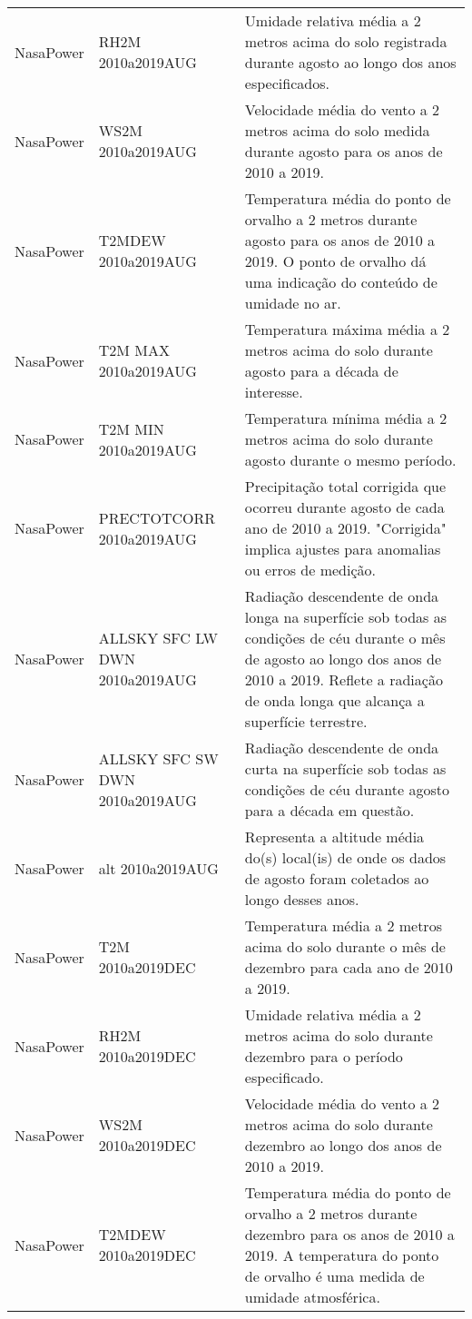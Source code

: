 \begin{longtable}{@{} p{4cm} p{4cm} p{8cm} @{}}
	NasaPower &
	RH2M 2010a2019AUG &
	Umidade relativa média a 2 metros acima do solo registrada durante agosto ao longo dos anos especificados. \\
	NasaPower &
	WS2M 2010a2019AUG &
	Velocidade média do vento a 2 metros acima do solo medida durante agosto para os anos de 2010 a 2019. \\
	NasaPower &
	T2MDEW 2010a2019AUG &
	Temperatura média do ponto de orvalho a 2 metros durante agosto para os anos de 2010 a 2019. O ponto de orvalho dá uma indicação do conteúdo de umidade no ar. \\
	NasaPower &
	T2M MAX 2010a2019AUG &
	Temperatura máxima média a 2 metros acima do solo durante agosto para a década de interesse. \\
	NasaPower &
	T2M MIN 2010a2019AUG &
	Temperatura mínima média a 2 metros acima do solo durante agosto durante o mesmo período. \\
	NasaPower &
	PRECTOTCORR 2010a2019AUG &
	Precipitação total corrigida que ocorreu durante agosto de cada ano de 2010 a 2019. "Corrigida" implica ajustes para anomalias ou erros de medição. \\
	NasaPower &
	ALLSKY SFC LW DWN 2010a2019AUG &
	Radiação descendente de onda longa na superfície sob todas as condições de céu durante o mês de agosto ao longo dos anos de 2010 a 2019. Reflete a radiação de onda longa que alcança a superfície terrestre. \\
	NasaPower &
	ALLSKY SFC SW DWN 2010a2019AUG &
	Radiação descendente de onda curta na superfície sob todas as condições de céu durante agosto para a década em questão. \\
	NasaPower &
	alt 2010a2019AUG &
	Representa a altitude média do(s) local(is) de onde os dados de agosto foram coletados ao longo desses anos. \\
	NasaPower &
	T2M 2010a2019DEC &
	Temperatura média a 2 metros acima do solo durante o mês de dezembro para cada ano de 2010 a 2019. \\
	NasaPower &
	RH2M 2010a2019DEC &
	Umidade relativa média a 2 metros acima do solo durante dezembro para o período especificado. \\
	NasaPower &
	WS2M 2010a2019DEC &
	Velocidade média do vento a 2 metros acima do solo durante dezembro ao longo dos anos de 2010 a 2019. \\
	NasaPower &
	T2MDEW 2010a2019DEC &
	Temperatura média do ponto de orvalho a 2 metros durante dezembro para os anos de 2010 a 2019. A temperatura do ponto de orvalho é uma medida de umidade atmosférica. \\

\end{longtable}
